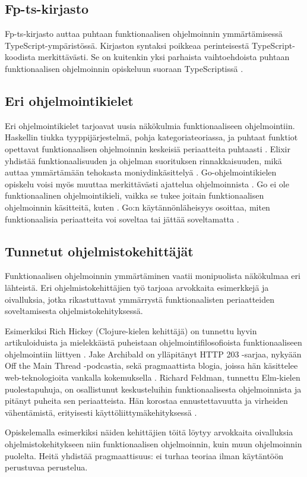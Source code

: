 \subsection{Fp-ts-kirjasto}

Fp-ts-kirjasto auttaa puhtaan funktionaalisen ohjelmoinnin ymmärtämisessä TypeScript-ympäristössä. Kirjaston syntaksi poikkeaa perinteisestä TypeScript-koodista merkittävästi. Se on kuitenkin yksi parhaista vaihtoehdoista puhtaan funktionaalisen ohjelmoinnin opiskeluun suoraan TypeScriptissä \cite{holvikari2021category}.

\subsection{Eri ohjelmointikielet}
Eri ohjelmointikielet tarjoavat uusia näkökulmia funktionaaliseen ohjelmointiin. Haskellin tiukka tyyppijärjestelmä, pohja kategoriateoriassa, ja puhtaat funktiot opettavat funktionaalisen ohjelmoinnin keskeisiä periaatteita puhtaasti \cite{haskellallmonad,haskellcomposition,haskellmonadlaws}. Elixir yhdistää funktionaalisuuden ja ohjelman suorituksen rinnakkaisuuden, mikä auttaa ymmärtämään tehokasta moniydinkäsittelyä \cite{elixir}. Go-ohjelmointikielen opiskelu voisi myös muuttaa merkittävästi ajattelua ohjelmoinnista \cite{golang}. Go ei ole funktionaalinen ohjelmointikieli, vaikka se tukee joitain funktionaalisen ohjelmoinnin käsitteitä, kuten . Go:n käytännönläheisyys osoittaa, miten funktionaalisia periaatteita voi soveltaa tai jättää soveltamatta \cite{golang}.

\subsection{Tunnetut ohjelmistokehittäjät}

Funktionaalisen ohjelmoinnin ymmärtäminen vaatii monipuolista näkökulmaa eri lähteistä. Eri ohjelmistokehittäjien työ tarjoaa arvokkaita esimerkkejä ja oivalluksia, jotka rikastuttavat ymmärrystä funktionaalisten periaatteiden soveltamisesta ohjelmistokehityksessä.

Esimerkiksi Rich Hickey (Clojure-kielen kehittäjä) on tunnettu hyvin artikuloiduista ja mielekkäistä puheistaan ohjelmointifilosofioista funktionaaliseen ohjelmointiin liittyen \cite{hickey_maybe_not,hickey_persistent_2009}. Jake Archibald on ylläpitänyt HTTP 203 -sarjaa, nykyään Off the Main Thread -podcastia, sekä pragmaattista blogia, joissa hän käsittelee web-teknologioita vankalla kokemuksella \cite{against_self_closing_tags,is_reduce_bad}. Richard Feldman, tunnettu Elm-kielen puolestapuhuja, on osallistunut keskusteluihin funktionaalisesta ohjelmoinnista ja pitänyt puheita sen periaatteista. Hän korostaa ennustettavuutta ja virheiden vähentämistä, erityisesti käyttöliittymäkehityksessä \cite{feldman_fp_pragmatists,impossiblebetter,stackoverflow:why_monad}.

Opiskelemalla esimerkiksi näiden kehittäjien töitä löytyy arvokkaita oivalluksia ohjelmistokehitykseen niin funktionaalisen ohjelmoinnin, kuin muun ohjelmoinnin puolelta. Heitä yhdistää pragmaattisuus: ei turhaa teoriaa ilman käytäntöön perustuvaa perustelua.
